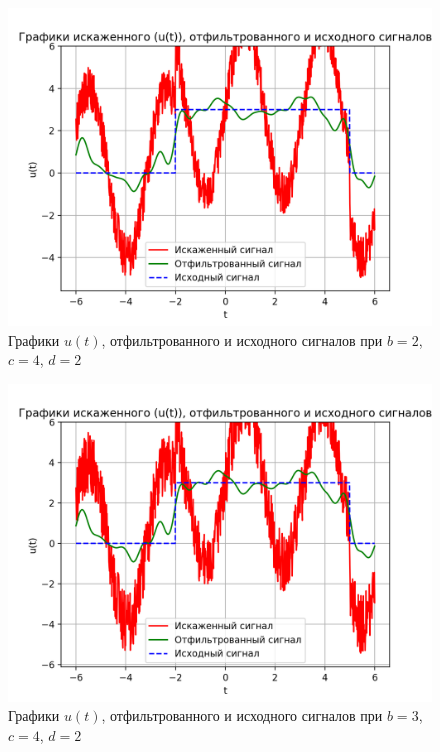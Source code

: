 \begin{figure}[ht!]
    \centering
    \includegraphics[scale=0.85]{media/1 task/specific_freq/Cleaned_2_4_2_-0,6_-0,22_-2,99_-1,6.png}
    \caption{Графики  $u(t)$, отфильтрованного и исходного сигналов при $b=2$,  $c=4$,  $d=2$}
    \label{fig:cleaned_2_4_2}
\end{figure}

\clearpage

\begin{figure}[ht!]
    \centering
    \includegraphics[scale=0.85]{media/1 task/specific_freq/Cleaned_3_4_2_-0,6_-0,22_-2,99_-1,6.png}
    \caption{Графики  $u(t)$, отфильтрованного и исходного сигналов при $b=3$,  $c=4$,  $d=2$}
    \label{fig:cleaned_3_4_2}
\end{figure}

